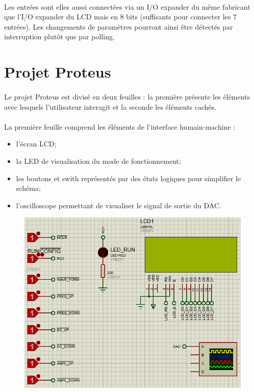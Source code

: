 \documentclass{article}
\begin{document}
    \paragraph{}
    Les entrées sont elles aussi connectées via un I/O expander du même fabricant que l'I/O expander du LCD mais en 8 bits (suffisants pour connecter les 7 entrées). Les changements de paramètres pourront ainsi être détectés par interruption plutôt que par polling.


    \section{Projet Proteus}
    \paragraph{}
    Le projet Proteus est divisé en deux feuilles : la première présente les éléments avec lesquels l'utilisateur interagit et la seconde les éléments cachés.

    \paragraph{}
    La première feuille comprend les éléments de l'interface humain-machine :
    \begin{itemize}[label=$\bullet$]
        \item l'écran LCD;
        \item la LED de visualisation du mode de fonctionnement;
        \item les boutons et swith représentés par des états logiques pour simplifier le schéma;
        \item l'oscilloscope permettant de visualiser le signal de sortie du DAC.
    \end{itemize}

    \begin{figure}[H]
        \centering
        \includegraphics[width=.55\textwidth]{./images/proteus_rs1.png}
    \end{figure}
\end{document}
